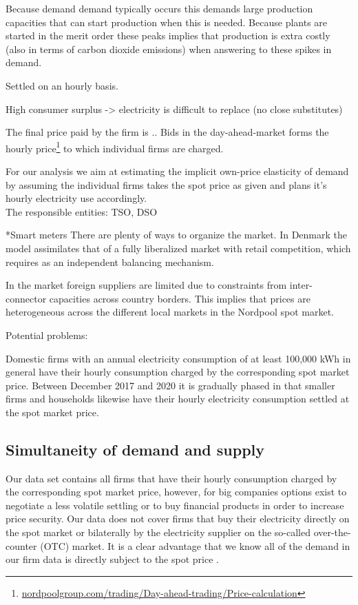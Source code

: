 Because demand demand typically occurs this demands large production capacities that can start production when this is needed. Because plants are started in the merit order these peaks implies that production is extra costly (also in terms of carbon dioxide emissions) when answering to these spikes in demand.

Settled on an hourly basis. 
 
High consumer surplus -> electricity is difficult to replace (no close substitutes) 

The final price paid by the firm is .. 
Bids in the day-ahead-market forms the hourly price\footnote{\url{nordpoolgroup.com/trading/Day-ahead-trading/Price-calculation}} to which individual firms are charged. 

For our analysis we aim at estimating the implicit own-price elasticity of demand by assuming the individual firms takes the spot price as given and plans it's hourly electricity use accordingly.
\medskip\\

The responsible entities: TSO, DSO

*Smart meters
There are plenty of ways to organize the market. In Denmark the model assimilates that of a fully liberalized market with retail competition, which requires as an independent balancing mechanism. 





In the market foreign suppliers are limited due to constraints from inter-connector capacities across country borders. This implies that prices are heterogeneous across the different local markets in the Nordpool spot market. 

Potential problems: 

Domestic firms with an annual electricity consumption of at least 100,000 kWh in general have their hourly consumption charged by the corresponding spot market price. Between December 2017 and 2020 it is gradually phased in that
smaller firms and households likewise have their hourly electricity consumption settled at the spot market price.

\subsection{Simultaneity of demand and supply}
\label{subsec:t_simultaneity}
Our data set contains all firms that have their hourly consumption charged by the corresponding spot market price, however, for big companies options exist to negotiate a less volatile settling or to buy financial products in order to increase price security. Our data does not cover firms that buy their electricity directly on the spot market or bilaterally by the electricity supplier on the so-called over-the-counter (OTC) market. It is a clear advantage that we know all of the demand in our firm data is directly subject to the spot price \citep{lijesen2007real}.


